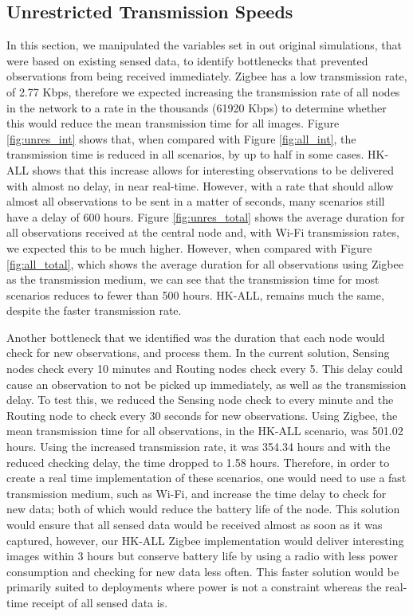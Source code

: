 \subsection{Unrestricted Transmission Speeds}
In this section, we manipulated the variables set in out original simulations, that were based on existing sensed data, to identify bottlenecks that prevented observations from being received immediately. Zigbee has a low transmission rate, of 2.77 Kbps, therefore we expected increasing the transmission rate of all nodes in the network to a rate in the thousands (61920 Kbps) to determine whether this would reduce the mean transmission time for all images. Figure \ref{fig:unres_int} shows that, when compared with Figure \ref{fig:all_int}, the transmission time is reduced in all scenarios, by up to half in some cases. HK-ALL shows that this increase allows for interesting observations to be delivered with almost no delay, in near real-time. However, with a rate that should allow almost all observations to be sent in a matter of seconds, many scenarios still have a delay of 600 hours. Figure \ref{fig:unres_total} shows the average duration for all observations received at the central node and, with Wi-Fi transmission rates, we expected this to be much higher. However, when compared with Figure \ref{fig:all_total}, which shows the average duration for all observations using Zigbee as the transmission medium, we can see that the transmission time for most scenarios reduces to fewer than 500 hours. HK-ALL, remains much the same, despite the faster transmission rate. 

Another bottleneck that we identified was the duration that each node would check for new observations, and process them. In the current solution, Sensing nodes check every 10 minutes and Routing nodes check every 5. This delay could cause an observation to not be picked up immediately, as well as the transmission delay. To test this, we reduced the Sensing node check to every minute and the Routing node to check every 30 seconds for new observations. Using Zigbee, the mean transmission time for all observations, in the HK-ALL scenario, was 501.02 hours. Using the increased transmission rate, it was 354.34 hours and with the reduced checking delay, the time dropped to 1.58 hours. Therefore, in order to create a real time implementation of these scenarios, one would need to use a fast transmission medium, such as Wi-Fi, and increase the time delay to check for new data; both of which would reduce the battery life of the node. This solution would ensure that all sensed data would be received almost as soon as it was captured, however, our HK-ALL Zigbee implementation would deliver interesting images within 3 hours but conserve battery life by using a radio with less power consumption and checking for new data less often. This faster solution would be primarily suited to deployments where power is not a constraint whereas the real-time receipt of all sensed data is.

